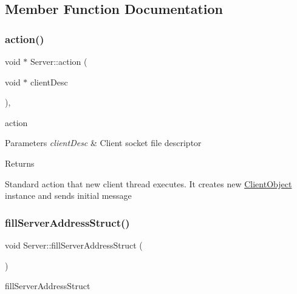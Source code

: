 \subsection{Member Function Documentation}
\mbox{\label{classServer_a75b8fdcfd5e0438efe7bb79b317caa16}} 
\subsubsection{\texorpdfstring{action()}{action()}}
{\footnotesize\ttfamily void $\ast$ Server\+::action (\begin{DoxyParamCaption}\item[{void $\ast$}]{client\+Desc }\end{DoxyParamCaption})\hspace{0.3cm}{\ttfamily [static]}, {\ttfamily [private]}}



action 


\begin{DoxyParams}{Parameters}
{\em client\+Desc} & Client socket file descriptor \\
\hline
\end{DoxyParams}
\begin{DoxyReturn}{Returns}

\end{DoxyReturn}
Standard action that new client thread executes. It creates new \hyperlink{classClientObject}{Client\+Object} instance and sends initial message \mbox{\label{classServer_a684bf0fce1ec62711a60d0cc3d25e8f8}} 
\subsubsection{\texorpdfstring{fill\+Server\+Address\+Struct()}{fillServerAddressStruct()}}
{\footnotesize\ttfamily void Server\+::fill\+Server\+Address\+Struct (\begin{DoxyParamCaption}{ }\end{DoxyParamCaption})\hspace{0.3cm}{\ttfamily [private]}}



fill\+Server\+Address\+Struct 

